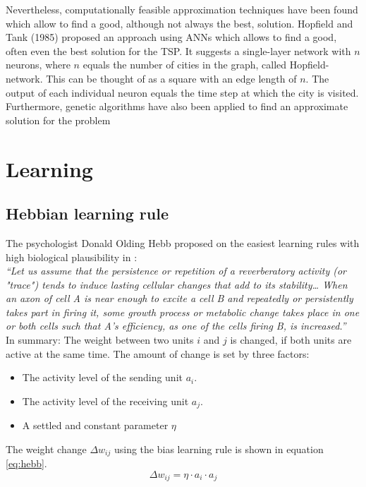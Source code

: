 \documentclass[10pt,a4paper,DIV=11]{scrreprt}
\begin{document}
Nevertheless, computationally feasible approximation techniques have been found which allow to find a good, although not always the best, solution. Hopfield and Tank (1985) proposed an approach using ANNs which allows to find a good, often even the best solution for the TSP. It suggests a single-layer network with $n$ neurons, where $n$ equals the number of cities in the graph, called Hopfield-network. This can be thought of as a square with an edge length of $n$. The output of each individual neuron equals the time step at which the city is visited. Furthermore, genetic algorithms have also been applied to find an approximate solution for the problem %

\chapter{Learning}
\label{ch:learning}
\section{Hebbian learning rule}
The psychologist Donald Olding Hebb proposed on the easiest learning rules with high biological plausibility in \cite{HEBB}:\\

\textit{“Let us assume that the persistence or repetition of a reverberatory activity (or "trace") tends to induce lasting cellular changes that add to its stability\dots 
When an axon of cell A is near enough to excite a cell B and repeatedly or persistently takes part in firing it, some growth process or metabolic change takes place in one or 
both cells such that A's efficiency, as one of the cells firing B, is increased.”}\\

In summary: The weight between two units $i$ and $j$ is changed, if both units are active at the same time. The amount of change is set by three factors:

\begin{itemize}
\item The activity level of the sending unit $a_i$.
\item The activity level of the receiving unit $a_j$.
\item A settled and constant parameter $\eta$
\end{itemize}

The weight change $\Delta w_{ij}$ using the bias learning rule is shown in equation \eqref{eq:hebb}.
\begin{equation}
\Delta w_{ij} = \eta \cdot a_i \cdot a_j
\label{eq:hebb}
\end{equation}
\end{document}
